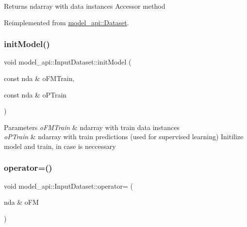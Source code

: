 \begin{DoxyReturn}{Returns}
ndarray with data instances Accessor method 
\end{DoxyReturn}


Reimplemented from \hyperlink{classmodel__api_1_1Dataset_aa2ae7007705796c05e5df64a3d1cda0e}{model\+\_\+api\+::\+Dataset}.

\mbox{\label{classmodel__api_1_1InputDataset_af7d130afc8889825573e738906397714}} 
\subsubsection{\texorpdfstring{init\+Model()}{initModel()}}
{\footnotesize\ttfamily void model\+\_\+api\+::\+Input\+Dataset\+::init\+Model (\begin{DoxyParamCaption}\item[{const nda \&}]{o\+F\+M\+Train,  }\item[{const nda \&}]{o\+P\+Train }\end{DoxyParamCaption})}


\begin{DoxyParams}{Parameters}
{\em o\+F\+M\+Train} & ndarray with train data instances \\
\hline
{\em o\+P\+Train} & ndarray with train predictions (used for supervised learning) Initilize model and train, in case is neccessary \\
\hline
\end{DoxyParams}
\mbox{\label{classmodel__api_1_1InputDataset_a59c9f5a14675794a67ef0eafa7550d8d}} 
\subsubsection{\texorpdfstring{operator=()}{operator=()}\hspace{0.1cm}{\footnotesize\ttfamily [1/2]}}
{\footnotesize\ttfamily void model\+\_\+api\+::\+Input\+Dataset\+::operator= (\begin{DoxyParamCaption}\item[{nda \&}]{o\+FM }\end{DoxyParamCaption})}


